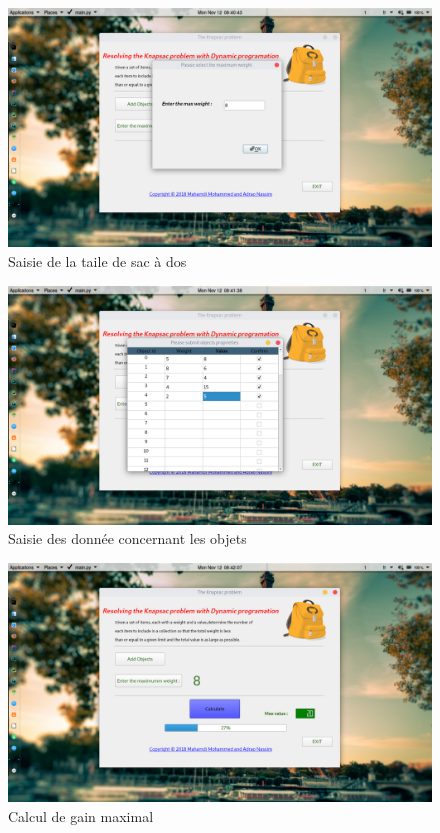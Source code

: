 \documentclass[12pt]{report}
\begin{document}
\begin{figure}[h!]
	\centering
	\includegraphics[scale=1, width=18cm]{../screenshots/2.png}
	\caption{Saisie de la taile de sac à dos}	
	\end{figure}
	\begin{figure}[h!]
	\centering
	\includegraphics[scale=1, width=18cm]{../screenshots/3.png}
	\caption{Saisie des donnée concernant les objets}
	\end{figure}
	\begin{figure}[h!]
	\centering
	\includegraphics[scale=1, width=18cm]{../screenshots/4.png}
	\caption{Calcul de gain maximal}
	\end{figure}
\end{document}
